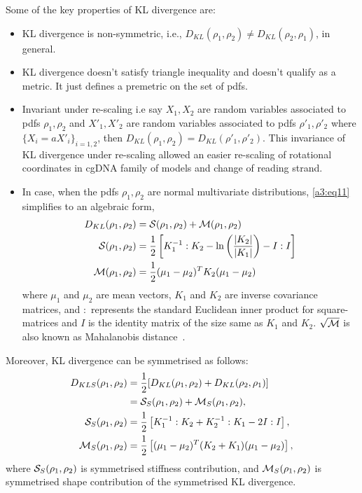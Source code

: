 Some of the key properties of KL divergence are: 
\begin{itemize}
    \item KL divergence is non-symmetric, i.e., $D_{KL}(\rho_1,\rho_2) \ne D_{KL}(\rho_2,\rho_1)$, in general. 
\item KL divergence doesn't satisfy triangle inequality and doesn't qualify as a metric. It just defines a premetric on the set of pdfs. 
\item Invariant under re-scaling i.e say $X_1,X_2$ are random 
variables associated to pdfs $\rho_1, \rho_2$ and $X'_1,X'_2$ are random 
variables associated to pdfs $\rho'_1, \rho'_2$ where $\{X_i = aX'_i\}_{i=1,2}$, then $D_{KL}(\rho_1,\rho_2)=D_{KL}(\rho'_1,\rho'_2)$.
This invariance of KL divergence under re-scaling allowed an easier 
re-scaling of rotational coordinates in cgDNA family of models and change of reading strand. 
\item In case, when the pdfs $\rho_1, \rho_2$ are normal multivariate distributions, \cref{a3:eq11} simplifies to an algebraic form, 
\begin{equation}
\begin{split}
D_{KL}(\rho_1,\rho_2)  &=\S(\rho_1,\rho_2) + \M(\rho_1,\rho_2) \\
\S(\rho_1,\rho_2) &= \frac{1}{2}\left[ K_1^{-1}:K_2
-\ln\left(\frac{|K_2|}{|K_1|}\right)-I:I\right] \\  
\M(\rho_1,\rho_2)&= \frac{1}{2} (\mu_1-\mu_2)^T K_2(\mu_1-\mu_2)
 \end{split}
\label{a3:eq12}  
\end{equation}
where $\mu_1$ and $\mu_2$ are mean vectors, $K_1$ and $K_2$ are inverse
covariance matrices, and $:$ represents the standard Euclidean inner product 
for square-matrices and $I$ is the identity matrix of the size same as $K_1$ and $K_2$. $\sqrt{\M}$ is also known as Mahalanobis distance~\cite{mahal}.  
\end{itemize}

Moreover, KL divergence can be symmetrised as follows:
\begin{equation}
\begin{split}
D_{KLS}(\rho_1,\rho_2) &= \frac{1}{2}[D_{KL}(\rho_1,\rho_2) + D_{KL}(\rho_2,\rho_1)]\\
 & =  \S_{S}(\rho_1,\rho_2) + \M_{S}(\rho_1,\rho_2),\\
\S_{S}(\rho_1,\rho_2) & =  \frac{1}{2}\left[ K_1^{-1}:K_2 + K_2^{-1}:K_1 -2I:I\right],\\
\M_{S}(\rho_1,\rho_2)&=  \frac{1}{2} \left[(\mu_1-\mu_2)^T (K_2+K_1) (\mu_1-\mu_2)\right],
\end{split}
\label{a3:eq13}
\end{equation}
where $\S_{S}(\rho_1,\rho_2)$ is symmetrised stiffness contribution,
and $\M_{S}(\rho_1,\rho_2)$ is symmetrised shape contribution of the symmetrised KL divergence. 

\clearpage